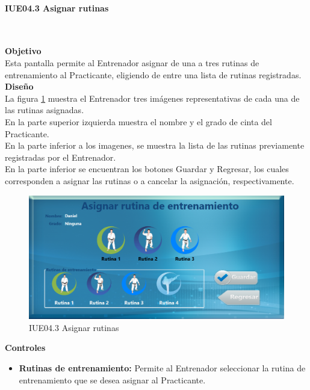 \paragraph{IUE04.3 Asignar rutinas} \hspace{1cm}\\ 
\label{pant:IUE04.3}

\textbf{\textcolor[rgb]{0, 0, 0.545098}{Objetivo}}\\
Esta pantalla permite al Entrenador asignar de una a tres rutinas de entrenamiento al Practicante, eligiendo de entre una lista de rutinas registradas.\\

\textbf{\textcolor[rgb]{0, 0, 0.545098}{Diseño}}\\
La figura \ref{fig:IUE04.3} muestra el Entrenador tres imágenes representativas de cada una de las rutinas asignadas.\\

En la parte superior izquierda muestra el nombre y el grado de cinta del Practicante.\\

En la parte inferior a los imagenes, se muestra la lista de las rutinas previamente registradas por el Entrenador.\\

En la parte inferior se encuentran los botones Guardar y Regresar, los cuales corresponden a asignar las rutinas o a cancelar la asignación, respectivamente.\\

\begin{figure}[H]
	\centering
		\includegraphics[scale=0.5]{./Figuras/Pantallas/IUE04_3Asignar_rutinas}
	\caption{IUE04.3 Asignar rutinas}
	\label{fig:IUE04.3}
\end{figure}

\textbf{\textcolor[rgb]{0, 0, 0.545098}{Controles}}
\begin{itemize}
	\item \textbf{\textcolor[rgb]{0, 0, 0.545098}{Rutinas de entrenamiento:}} Permite al Entrenador seleccionar la rutina de entrenamiento que se desea asignar al Practicante.
\end{itemize}

